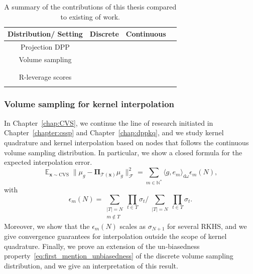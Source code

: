 \documentclass[twoside,11pt]{book}
\numberwithin{theorem}{chapter}
\numberwithin{definition}{chapter}
\numberwithin{proposition}{chapter}
\numberwithin{corollary}{chapter}
\numberwithin{example}{chapter}
\numberwithin{lemma}{chapter}
\numberwithin{assumption}{chapter}
\numberwithin{equation}{chapter}
\numberwithin{figure}{chapter}
\DeclareMathOperator{\EX}{\mathbb{E}}
\DeclareMathOperator{\F}{\mathcal{F}}
\begin{document}
\begin{table}
\centering
 \begin{tabular}{| c| c| c| c|}
 \hline
  Distribution/ Setting & Discrete & Continuous\\
 \hline
 Projection DPP& \cite{BeBaCh18} & \cite{BeBaCh19} \\
 \hline
 Volume sampling& \cite{BeTe03}& \cite{BeBaCh20} \\
 & \cite{DRVW06} & \\ 
 & \cite{DeWa17} &  \\
 \hline
 R-leverage scores & \cite{Bac13}  & \cite{Bac17}  \\
 &  \cite{AlMa15} &   \\
\hline
\end{tabular}
\caption{A summary of the contributions of this thesis compared to existing of work.\label{table:matrix_operator_duality}}
\end{table}


\subsubsection{Volume sampling for kernel interpolation}
In Chapter~\ref{chap:CVS}, we continue the line of research initiated in Chapter~\ref{chapter:cssp} and Chapter~\ref{chap:dppkq}, and we study kernel quadrature and kernel interpolation based on nodes that follows the  continuous volume sampling distribution. In particular, we show a closed formula for the expected interpolation error.
\begin{equation}
\EX_{\bm{x} \sim \mathrm{CVS}} \|\mu_{g} - \bm{\Pi}_{\mathcal{T}(\bm{x})} \mu_{g}\|_{\F}^{2} = \sum\limits_{m \in \mathbb{N}^{*}} \langle g,e_{m} \rangle_{\mathrm{d}\omega} \epsilon_{m}(N),
\end{equation}
with
\begin{equation}
\epsilon_{m}(N) = \sum\limits_{\substack{|T| = N\\ m \notin T}} \prod\limits_{t \in T} \sigma_{t} \bigg/\sum\limits_{\substack{|T| = N}} \prod\limits_{t \in T} \sigma_{t}.
\end{equation}
Moreover, we show that the $\epsilon_{m}(N)$ scales as $\sigma_{N+1}$ for several RKHS, and we give convergence guarantees for interpolation outside the scope of kernel quadrature. Finally, we prove an extension of the un-biasedness property~\eqref{eq:first_mention_unbiasedness} of the discrete volume sampling distribution, and we give an interpretation of this result.
\end{document}
